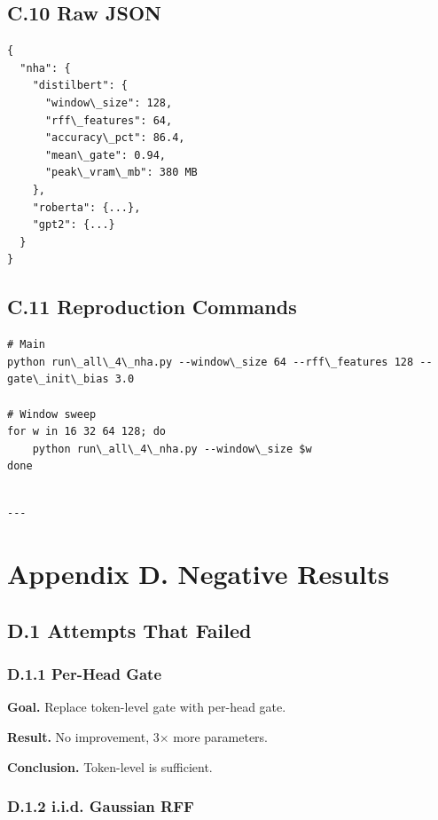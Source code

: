 \subsection{C.10 Raw JSON}

\begin{lstlisting}
{
  "nha": {
    "distilbert": {
      "window\_size": 128,
      "rff\_features": 64,
      "accuracy\_pct": 86.4,
      "mean\_gate": 0.94,
      "peak\_vram\_mb": 380 MB
    },
    "roberta": {...},
    "gpt2": {...}
  }
}
\end{lstlisting}

\subsection{C.11 Reproduction Commands}

\begin{lstlisting}
# Main
python run\_all\_4\_nha.py --window\_size 64 --rff\_features 128 --gate\_init\_bias 3.0

# Window sweep
for w in 16 32 64 128; do
    python run\_all\_4\_nha.py --window\_size $w
done
\end{lstlisting}
\begin{lstlisting}

---
\end{lstlisting}


\section{Appendix D. Negative Results}

\subsection{D.1 Attempts That Failed}

\subsubsection{D.1.1 Per-Head Gate}

\textbf{Goal.} Replace token-level gate with per-head gate.

\textbf{Result.} No improvement, 3$\times$ more parameters.

\textbf{Conclusion.} Token-level is sufficient.

\subsubsection{D.1.2 i.i.d. Gaussian RFF}


